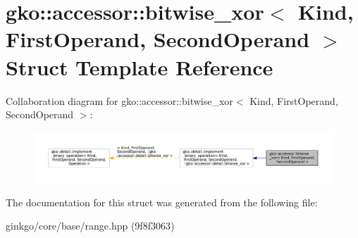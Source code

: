 \hypertarget{structgko_1_1accessor_1_1bitwise__xor}{}\section{gko\+:\+:accessor\+:\+:bitwise\+\_\+xor$<$ Kind, First\+Operand, Second\+Operand $>$ Struct Template Reference}
\label{structgko_1_1accessor_1_1bitwise__xor}


Collaboration diagram for gko\+:\+:accessor\+:\+:bitwise\+\_\+xor$<$ Kind, First\+Operand, Second\+Operand $>$\+:
\nopagebreak
\begin{figure}[H]
\begin{center}
\leavevmode
\includegraphics[width=350pt]{structgko_1_1accessor_1_1bitwise__xor__coll__graph}
\end{center}
\end{figure}


The documentation for this struct was generated from the following file\+:\begin{DoxyCompactItemize}
\item 
ginkgo/core/base/range.\+hpp (9f8f3063)\end{DoxyCompactItemize}
